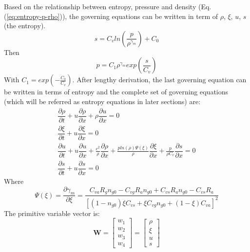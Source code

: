 Based on the relationship between entropy, pressure and density (Eq. (\ref{eq:entropy-p-rho})), the governing equations can be written in term of $\rho	$, $\xi$, $u$, $s$ (the entropy).
\begin{equation}
s=C_v ln(\dfrac{p}{\rho^{\gamma_m}})+C_0 \label{eq:entropy-p-rho}
\end{equation}
Then
\begin{equation}
p=C_1 \rho^{\gamma_m} exp(\frac{s}{C_v})
\end{equation}
With $C_1=exp(-\frac{C_0}{C_v})$.
After lengthy derivation, the last governing equation can be written in terms of entropy and the complete set of governing equations (which will be referred as entropy equations in later sections) are: 
\begin{eqnarray}
\dfrac{\partial \rho}{\partial t} + u \dfrac{\partial \rho} {\partial x} + \rho \dfrac{\partial u} {\partial x}= 0 \label{eq:gov-EntropyForm-rho-1d-hom} \\
\dfrac{\partial \xi}{\partial t} + u \dfrac{\partial \xi} {\partial x}= 0 \label{eq:gov-EntropyForm-ks-1d-hom}\\
\dfrac{\partial u}{\partial t} + u \dfrac{\partial u} {\partial x} + \frac{c^2}{\rho} \dfrac{\partial \rho} {\partial x} + \frac{p ln(\rho) \Psi(\xi)}{\rho} \dfrac{\partial \xi} {\partial x} + \frac{p}{\rho C_v} \dfrac{\partial s} {\partial x} = 0 \label{eq:gov-EntropyForm-v-1d-hom} \\
\dfrac{\partial s}{\partial t} + u \dfrac{\partial s} {\partial x}= 0 \label{eq:gov-EntropyForm-e-1d-hom}
\end{eqnarray}
Where
\begin{equation}
\Psi(\xi) = \dfrac{\partial \gamma_m}{ \partial \xi}
= \frac{C_{va}R_g n_{g0} - C_{vg}R_a n_{g0} + C_{vs}R_a n_{g0} - C_{vs} R_a}{\left[(1-n_{g0}) \xi C_{vs} + \xi C_{vg} n_{g0}+(1-\xi)C_{va}\right]^2}
\end{equation}
The primitive variable vector is:
\begin{equation}
   \textbf{W}=\begin{bmatrix}
         w_1 \\
         w_2 \\
         w_3 \\
         w_4
     \end{bmatrix}
    =\begin{bmatrix}
         \rho \\
         \xi \\
         u   \\
         s
     \end{bmatrix}
\end{equation}
